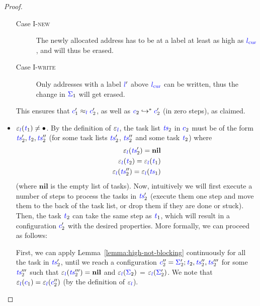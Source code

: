 \documentclass{llncs}
\newcommand{\Varid}[1]{\mathit{#1}}
\begin{document}
\begin{proof}
\begin{itemize}
\begin{description}
      \item[Case \textsc{I-new}] The newly allocated address has to be at a
      label at least as high as \ensuremath{\lcurr}, and will thus be erased.
      \item[Case \textsc{I-write}] Only addresses with a label \ensuremath{\ifc{l}'} above
      \ensuremath{\lcurr} can be written, thus the change in \ensuremath{\ifc{\Sigma}_{1}} will get erased.
    \end{description}
    This ensures that ${\color{blue} c}_{1}'\approx_{{\color{blue} l}}{\color{blue} c}_{2}'$, as well as
    ${\color{blue} c}_{2} \hookrightarrow^* {\color{blue} c}_{2}'$ (in zero steps), as claimed.
\item $\ensuremath{\varepsilon_{\ifc{l}}(\ifc{\Varid{t}}_{1})}\neq\ensuremath{\bullet}$.
    By the definition of \ensuremath{\varepsilon_{\ifc{l}}}, the task list \ensuremath{\ifc{\Varid{ts}}_{2}}
    in \ensuremath{\ifc{c}_{2}} must be of the
    form \ensuremath{\ifc{\Varid{ts}}_{2}',\ifc{\Varid{t}}_{2},\ifc{\Varid{ts}}_{2}''} (for some task lists \ensuremath{\ifc{\Varid{ts}}_{2}'}, \ensuremath{\ifc{\Varid{ts}}_{2}''} and
    some task \ensuremath{\ifc{\Varid{t}}_{2}})
    where
    \begin{align}
    \ensuremath{\varepsilon_{\ifc{l}}(\ifc{\Varid{ts}}_{2}')} = \ensuremath{\mathbf{nil}} \\
    \ensuremath{\varepsilon_{\ifc{l}}(\ifc{\Varid{t}}_{2})} = \ensuremath{\varepsilon_{\ifc{l}}(\ifc{\Varid{t}}_{1})} \\
    \ensuremath{\varepsilon_{\ifc{l}}(\ifc{\Varid{ts}}_{2}'')} = \ensuremath{\varepsilon_{\ifc{l}}(\ifc{\Varid{ts}}_{1})}
    \end{align}
    (where \ensuremath{\mathbf{nil}} is the empty list of tasks).
    Now, intuitively we will first execute a number of steps to process
    the tasks in \ensuremath{\ifc{\Varid{ts}}_{2}'} (execute them one step and move them to the back
    of the task list, or drop them if they are done or stuck).  Then, the task
    \ensuremath{\ifc{\Varid{t}}_{2}} can take the same step as \ensuremath{\ifc{\Varid{t}}_{1}}, which will result in a configuration
    \ensuremath{\ifc{c}_{2}'}
    with the desired properties.
    More formally, we can proceed as follows:
    
    First, we can apply Lemma~\ref{lemma:high-not-blocking} continuously
    for all the task in \ensuremath{\ifc{\Varid{ts}}_{2}'},
    until we reach a configuration \ensuremath{\ifc{c}_{2}''\mathrel{=}\ifc{\Sigma}_{2}';\ifc{\Varid{t}}_{2},\ifc{\Varid{ts}}_{2}'',\ifc{\Varid{ts}}_{2}'''}
    for some \ensuremath{\ifc{\Varid{ts}}_{2}'''} such
    that \ensuremath{\varepsilon_{\ifc{l}}(\ifc{\Varid{ts}}_{2}''')\mathrel{=}\mathbf{nil}} and \ensuremath{\varepsilon_{\ifc{l}}(\ifc{\Sigma}_{2})} = \ensuremath{\varepsilon_{\ifc{l}}(\ifc{\Sigma}_{2}')}.
    We note that \ensuremath{\varepsilon_{\ifc{l}}(\ifc{c}_{1})\mathrel{=}\varepsilon_{\ifc{l}}(\ifc{c}_{2}'')} (by the definition of
    \ensuremath{\varepsilon_{\ifc{l}}}).
    

\end{itemize}
\end{proof}
\end{document}
